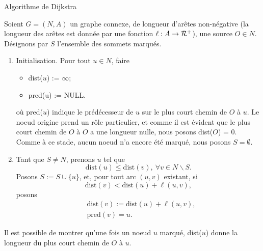 \begin{algo}{Algorithme de Dijkstra}

Soient $G = (N,A)$ un graphe connexe, de longueur d'arêtes non-négative (la longueur des arêtes est donnée par une fonction $\ell: A \rightarrow \mathcal{R}^+$), une source $O \in N$.
Désignons par $S$ l'ensemble des sommets marqués.
\begin{enumerate}
\item Initialisation. Pour tout $u \in N$, faire
\begin{itemize}
\item
dist($u$) := $\infty$;
\item
pred(u) := NULL.
\end{itemize}
où pred($u$) indique le prédécesseur de $u$ sur le plus court chemin de $O$ à $u$.
Le noeud origine prend un rôle particulier, et comme il est évident que le plus court chemin de $O$ à $O$ a une longueur nulle, nous posons dist($O$) = 0.
Comme à ce stade, aucun noeud n'a encore été marqué, nous posons $S = \emptyset$.
\item
Tant que $S \ne N$, prenons $u$ tel que
\[
\mbox{dist}(u) \leq \mbox{dist}(v),\ \forall v \in N \backslash S.
\]
Posons $S := S \cup \lbrace u \rbrace$, et, pour tout arc $(u,v)$ existant, si
\[
\mbox{dist}(v) < \mbox{dist}(u) + \ell(u,v),
\]
posons
\begin{align*}
& \mbox{dist}(v) := \mbox{dist}(u) + \ell(u,v),\\
& \mbox{pred}(v) = u.
\end{align*}
\end{enumerate}
\end{algo}
Il est possible de montrer qu'une fois un noeud $u$ marqué, dist($u$) donne la longueur du plus court chemin de $O$ à $u$.

